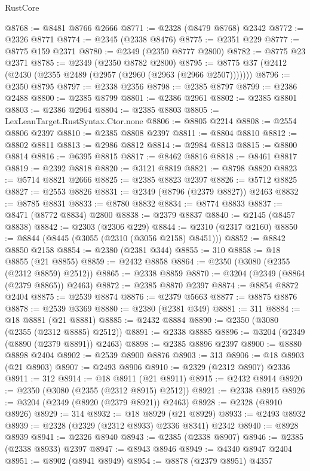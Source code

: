 \begin{lexlean}{RustCore}
\begin{coremodule}
@8768 := @8481 @8766 @2666
@8771 := @2328 (@8479 @8768) @2342
@8772 := @2326 @8771
@8774 := @2345 (@2338 @8476)
@8775 := @2351 @229
@8777 := @8775 @159 @2371
@8780 := @2349 (@2350 @8777 @2800)
@8782 := @8775 @23 @2371
@8785 := @2349 (@2350 @8782 @2800)
@8795 := @8775 @37 (@2412 (@2430 (@2355 @2489 (@2957 (@2960 (@2963 (@2966 @2507)))))))
@8796 := @2350 @8795
@8797 := @2338 @2356
@8798 := @2385 @8797
@8799 := @2386 @2488
@8800 := @2385 @8799
@8801 := @2386 @2961
@8802 := @2385 @8801
@8803 := @2386 @2964
@8804 := @2385 @8803
@8805 := LexLeanTarget.RustSyntax.Ctor.none
@8806 := @8805 @2214
@8808 := @2554 @8806 @2397
@8810 := @2385 @8808 @2397
@8811 := @8804 @8810
@8812 := @8802 @8811
@8813 := @2986 @8812
@8814 := @2984 @8813
@8815 := @8800 @8814
@8816 := @6395 @8815
@8817 := @8462 @8816
@8818 := @8461 @8817
@8819 := @2392 @8818
@8820 := @3121 @8819
@8821 := @8798 @8820
@8823 := @5714 @8821 @2666
@8825 := @2385 @8823 @2397
@8826 := @5712 @8825
@8827 := @2553 @8826
@8831 := @2349 (@8796 (@2379 @8827)) @2463
@8832 := @8785 @8831
@8833 := @8780 @8832
@8834 := @8774 @8833
@8837 := @8471 (@8772 @8834) @2800
@8838 := @2379 @8837
@8840 := @2145 (@8457 @8838)
@8842 := @2303 (@2306 @229)
@8844 := @2310 (@2317 @2160)
@8850 := @8844 (@8445 (@3055 (@2310 (@3056 @2158) @8451)))
@8852 := @8842 @8850 @2158
@8854 := @2380 (@2381 @344)
@8855 := 310
@8858 := @18 @8855 (@21 @8855)
@8859 := @2432 @8858
@8864 := @2350 (@3080 (@2355 (@2312 @8859) @2512))
@8865 := @2338 @8859
@8870 := @3204 (@2349 (@8864 (@2379 @8865)) @2463)
@8872 := @2385 @8870 @2397
@8874 := @8854 @8872 @2404
@8875 := @2539 @8874
@8876 := @2379 @5663
@8877 := @8875 @8876
@8878 := @2539 @3369
@8880 := @2380 (@2381 @349)
@8881 := 311
@8884 := @18 @8881 (@21 @8881)
@8885 := @2432 @8884
@8890 := @2350 (@3080 (@2355 (@2312 @8885) @2512))
@8891 := @2338 @8885
@8896 := @3204 (@2349 (@8890 (@2379 @8891)) @2463)
@8898 := @2385 @8896 @2397
@8900 := @8880 @8898 @2404
@8902 := @2539 @8900 @8876
@8903 := 313
@8906 := @18 @8903 (@21 @8903)
@8907 := @2493 @8906
@8910 := @2329 (@2312 @8907) @2336
@8911 := 312
@8914 := @18 @8911 (@21 @8911)
@8915 := @2432 @8914
@8920 := @2350 (@3080 (@2355 (@2312 @8915) @2512))
@8921 := @2338 @8915
@8926 := @3204 (@2349 (@8920 (@2379 @8921)) @2463)
@8928 := @2328 (@8910 @8926)
@8929 := 314
@8932 := @18 @8929 (@21 @8929)
@8933 := @2493 @8932
@8939 := @2328 (@2329 (@2312 @8933) @2336 @8341) @2342
@8940 := @8928 @8939
@8941 := @2326 @8940
@8943 := @2385 (@2338 @8907)
@8946 := @2385 (@2338 @8933) @2397
@8947 := @8943 @8946
@8949 := @4340 @8947 @2404
@8951 := @8902 (@8941 @8949)
@8954 := @8878 (@2379 @8951) @4357

\end{coremodule}
\end{lexlean}
